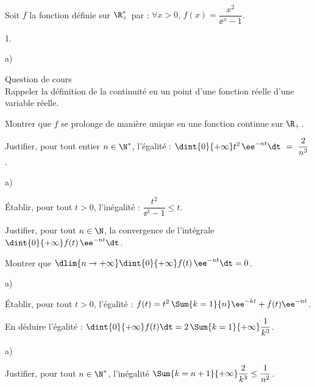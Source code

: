 \begin{exerciceAP}~\\
  Soit $f$ la fonction définie sur $\R_+^*$ par : $\forall x>0$, 
  $f(x) = \dfrac{x^2}{\ee^x -1}$.
  \begin{noliste}{1.}
    \setlength{\itemsep}{2mm}
    \item 
    \begin{noliste}{a)}
    \setlength{\itemsep}{2mm}
      \item Question de cours\\
      Rappeler la définition de la continuité en un point d'une fonction
      réelle d'une variable réelle.
      
      \item Montrer que $f$ se prolonge de manière unique en une 
      fonction continue sur $\R_+$.
    \end{noliste}
    
  \item Justifier, pour tout entier $n\in \N^*$, l'égalité :
    $\dint{0}{+\infty} t^2 \, \ee^{-nt} \dt \ = \ \dfrac{2}{n^3}$.
    
    \item 
    \begin{noliste}{a)}
    \setlength{\itemsep}{2mm}
      \item Établir, pour tout $t>0$, l'inégalité : $\dfrac{t^2}
      {\ee^t -1} \leq t$.
      
      \item Justifier, pour tout $n\in \N$, la convergence de 
      l'intégrale $\dint{0}{+\infty} f(t) \, \ee^{-nt} \dt$.
      
      \item Montrer que $\dlim{n\to +\infty} \dint{0}{+\infty}
      f(t) \, \ee^{-nt} \dt = 0$.
    \end{noliste}
    
    \item 
    \begin{noliste}{a)}
    \setlength{\itemsep}{2mm}
      \item Établir, pour tout $t>0$, l'égalité : $f(t) = t^2 \, 
      \Sum{k=1}{n} \ee^{-kt} + f(t) \ee^{-nt}$.
      
      \item En déduire l'égalité : $\dint{0}{+\infty} f(t) \dt = 
      2 \, \Sum{k=1}{+\infty} \dfrac{1}{k^3}$.
    \end{noliste}
    
    \item 
    \begin{noliste}{a)}
    \setlength{\itemsep}{2mm}
      \item Justifier, pour tout $n\in \N^*$, l'inégalité 
      $\Sum{k=n+1}{+\infty} \dfrac{2}{k^3} \leq \dfrac{1}{n^2}$.
      

\end{noliste}
\end{noliste}
\end{exerciceAP}
